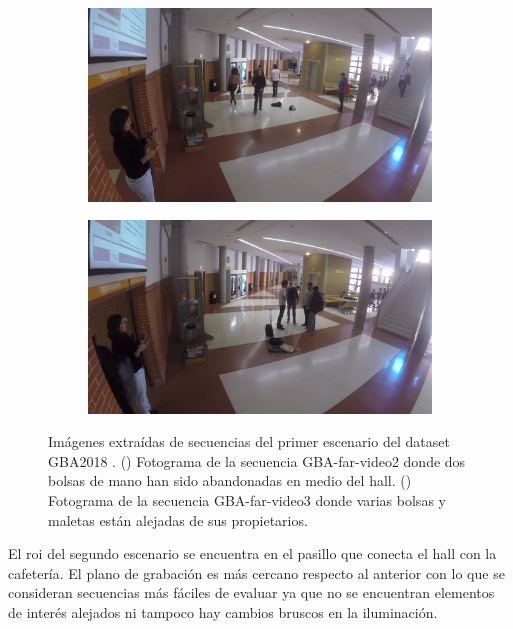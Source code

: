 \begin{figure}[ht!]
  \centering
  \begin{subfigure}[b]{0.4\textwidth}
    \includegraphics[width=\textwidth]{img/chapters/resultados/datasets/GBA_1.jpg}
    \caption{}
    \label{fig:GBA_1}
  \end{subfigure}
  \qquad\qquad
  \begin{subfigure}[b]{0.4\textwidth}
    \includegraphics[width=\textwidth]{img/chapters/resultados/datasets/GBA_2.jpg}
    \caption{}
    \label{fig:GBA_2}
  \end{subfigure}
  \caption{Imágenes extraídas de secuencias del primer escenario del dataset GBA2018 \cite{gba-dataset}.
    (\protect{}) Fotograma de la secuencia GBA-far-video2 donde dos bolsas de mano han sido abandonadas en medio del hall.
    (\protect{}) Fotograma de la secuencia GBA-far-video3 donde varias bolsas y maletas están alejadas de sus propietarios.}
  \label{fig:GBA1}
\end{figure}

El \gls{roi} del segundo escenario se encuentra en el pasillo que conecta el hall con la cafetería. El plano de grabación es más cercano respecto al anterior con lo que se consideran secuencias más fáciles de evaluar ya que no se encuentran elementos de interés alejados ni tampoco hay cambios bruscos en la iluminación.

